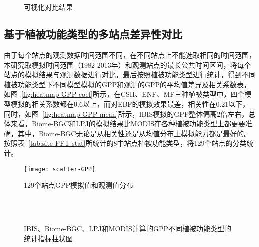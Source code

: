 \begin{figure}[!htbp]
    \centering
    \hfill
     \\
    \\
    \caption{可视化对比结果}
    \label{fig:visual-cmp-rst}
\end{figure}

\subsection{基于植被功能类型的多站点差异性对比}
由于每个站点的观测数据时间范围不同，在不同站点上不能选取相同的时间范围，本研究取模拟时间范围（1982-2013年）和观测站点的最长公共时间区间，将每个站点的模拟结果与观测数据进行对比，最后按照植被功能类型进行统计，得到不同植被功能类型下不同模型模拟的GPP和观测的GPP的平均值差异及相关系数表，如图~\ref{fig:heatmap-GPP-coef}所示，在CSH、ENF、MF三种植被类型中，四个模型模拟的相关系数都在0.6以上，而对EBF的模拟效果最差，相关性在0.21以下，同时，如图~\ref{fig:heatmap-GPP-mean}所示，IBIS模拟的GPP整体偏高2倍左右，总体来看，Biome-BGC和LPJ的模拟结果比MODIS在各种植被功能类型上都更要准确，其中，Biome-BGC无论是从相关性还是从均值分布上模拟能力都是最好的。
按照表~\ref{tab:site-PFT-stat}所统计的8中站点植被功能类型，将129个站点的分类统计。

\begin{figure}[!htbp]
    \centering
    \texttt{[image: scatter-GPP]}
    \caption{129个站点GPP模拟值和观测值分布}
    \label{fig:api-gateway-children}
\end{figure}

\begin{figure}[!htbp]
    \centering
    \hfill
     \\
    \hfill
     \\
    \caption{IBIS、Biome-BGC、LPJ和MODIS计算的GPP不同植被功能类型的统计指标柱状图}
    \label{fig:GPP-cmp-taylor}
\end{figure}

